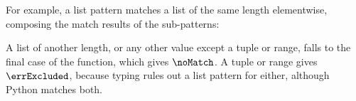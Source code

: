 
For example, a list pattern matches a list of the same length elementwise, composing the match results of the
sub-patterns:
\begin{defalign}

\end{defalign}
A list of another length, or any other value except a tuple or range, falls to the final case of the
function, which gives $\noMatch$. A tuple or range gives $\errExcluded$, because typing rules out a list pattern for either, although Python matches both.
